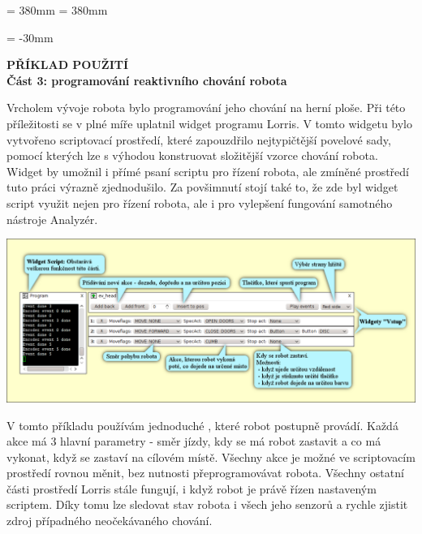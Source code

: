 \documentclass[17pt]{extreport}
\newcommand{\B}{\textbf} %
\begin{document}
\textheight = 380mm
\textwidth = 380mm
\newpage
\enlargethispage{400mm} %
\begin{landscape}
\voffset = -30mm %
\begin{center}
    \Large \B{PŘÍKLAD POUŽITÍ \\ Část 3: programování reaktivního chování robota}
\end{center}
\vspace{5mm}
Vrcholem vývoje robota bylo programování jeho chování na herní ploše. Při této příležitosti se v plné míře uplatnil widget  programu Lorris. V tomto widgetu bylo vytvořeno scriptovací prostředí, které zapouzdřilo nejtypičtější povelové sady, pomocí kterých lze s výhodou konstruovat složitější vzorce chování robota. Widget  by umožnil i přímé psaní scriptu pro řízení robota, ale zmíněné prostředí tuto práci výrazně zjednodušilo. Za povšimnutí stojí také to, že zde byl widget script využit nejen pro řízení robota, ale i pro vylepšení fungování samotného nástroje Analyzér.  
 
\begin{center}
\includegraphics{img/control2.png}
\end{center}

V tomto příkladu používám jednoduché , které robot postupně provádí. Každá akce má 3 hlavní parametry - směr jízdy, kdy se má robot zastavit a co má vykonat, když se zastaví na cílovém místě. Všechny akce je možné ve scriptovacím prostředí rovnou měnit, bez nutnosti přeprogramovávat robota. Všechny ostatní části prostředí Lorris stále fungují, i když robot je právě řízen nastaveným scriptem. Díky tomu lze sledovat stav robota i všech jeho senzorů a rychle zjistit zdroj případného neočekávaného chování. 
\end{landscape}
\end{document}
